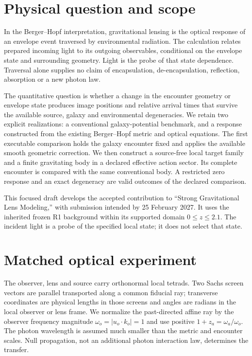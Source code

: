 \section{Physical question and scope}
In the Berger--Hopf interpretation, gravitational lensing is the optical
response of an envelope event traversed by environmental radiation. The
calculation relates prepared incoming light to its outgoing observables,
conditional on the envelope state and surrounding geometry. Light is the
probe of that state dependence. Traversal alone supplies no claim of
encapsulation, de-encapsulation, reflection, absorption or a new photon law.

The quantitative question is whether a change in the encounter geometry or
envelope state produces image positions and relative arrival times that
survive the available source, galaxy and environmental degeneracies.
We retain two explicit realizations: a conventional galaxy-potential
benchmark, and a response constructed from the existing Berger--Hopf metric
and optical equations. The first executable comparison holds the galaxy
encounter fixed and applies the available smooth geometric correction.
We then construct a source-free local target family and a finite gravitating
body in a declared effective action sector. Its complete encounter is
compared with the same conventional body. A restricted zero response and
an exact degeneracy are valid outcomes of the declared comparison.

This focused draft develops the accepted contribution to ``Strong
Gravitational Lens Modeling,'' with submission intended by 25 February 2027.
It uses the inherited frozen R1 background within its supported domain
$0\leq z\leq2.1$. The incident light is a probe of the specified local
state; it does not select that state.

\section{Matched optical experiment}
\label{sec:sl-experiment}
The observer, lens and source carry orthonormal local tetrads. Two Sachs
screen vectors are parallel transported along a common fiducial ray;
transverse coordinates are physical lengths in those screens and angles
are radians in the local observer or lens frame. We normalize the
past-directed affine ray by the observer frequency magnitude
$\omega_o=|u_o\!\cdot k_o|=1$ and use positive
$1+z_a=\omega_a/\omega_o$. The photon wavelength is assumed much smaller
than the metric and encounter scales. Null propagation, not an additional
photon interaction law, determines the transfer.

